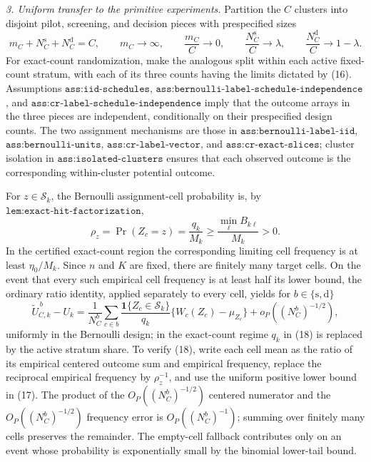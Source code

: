 \emph{3. Uniform transfer to the primitive experiments.}
Partition the \(C\) clusters into disjoint pilot, screening, and decision pieces with prespecified sizes
\[
 m_C+N_C^{\mathrm s}+N_C^{\mathrm d}=C,
 \qquad m_C\to\infty,
 \qquad \frac{m_C}{C}\to0,
 \qquad \frac{N_C^{\mathrm s}}C\to\lambda,
 \qquad \frac{N_C^{\mathrm d}}C\to1-\lambda.
\tag{16}
\]
For exact-count randomization, make the analogous split within each active fixed-count stratum, with each of its three counts having the limits dictated by (16).  Assumptions \(\texttt{ass:iid-schedules}\), \(\texttt{ass:bernoulli-label-schedule-independence}\), and \(\texttt{ass:cr-label-schedule-independence}\) imply that the outcome arrays in the three pieces are independent, conditionally on their prespecified design counts.  The two assignment mechanisms are those in \(\texttt{ass:bernoulli-label-iid}\), \(\texttt{ass:bernoulli-units}\), \(\texttt{ass:cr-label-vector}\), and \(\texttt{ass:cr-exact-slices}\); cluster isolation in \(\texttt{ass:isolated-clusters}\) ensures that each observed outcome is the corresponding within-cluster potential outcome.

For \(z\in\mathcal S_k\), the Bernoulli assignment-cell probability is, by \(\texttt{lem:exact-hit-factorization}\),
\[
 \rho_z=\Pr(Z_c=z)=\frac{q_k}{M_k}
 \geq\frac{\min_\ell B_{k\ell}}{M_k}>0.
\tag{17}
\]
In the certified exact-count region the corresponding limiting cell frequency is at least \(\eta_0/M_k\).  Since \(n\) and \(K\) are fixed, there are finitely many target cells.  On the event that every such empirical cell frequency is at least half its lower bound, the ordinary ratio identity, applied separately to every cell, yields for \(b\in\{\mathrm s,\mathrm d\}\)
\[
 \widetilde U_{C,k}^{\,b}-U_k
 =\frac1{N_C^b}\sum_{c\in b}
   \frac{\mathbf1\{Z_c\in\mathcal S_k\}}{q_k}
   \{W_c(Z_c)-\mu_{Z_c}\}
   +o_P((N_C^b)^{-1/2}),
\tag{18}
\]
uniformly in the Bernoulli design; in the exact-count regime \(q_k\) in (18) is replaced by the active stratum share.  To verify (18), write each cell mean as the ratio of its empirical centered outcome sum and empirical frequency, replace the reciprocal empirical frequency by \(\rho_z^{-1}\), and use the uniform positive lower bound in (17).  The product of the \(O_P((N_C^b)^{-1/2})\) centered numerator and the \(O_P((N_C^b)^{-1/2})\) frequency error is \(O_P((N_C^b)^{-1})\); summing over finitely many cells preserves the remainder.  The empty-cell fallback contributes only on an event whose probability is exponentially small by the binomial lower-tail bound.

